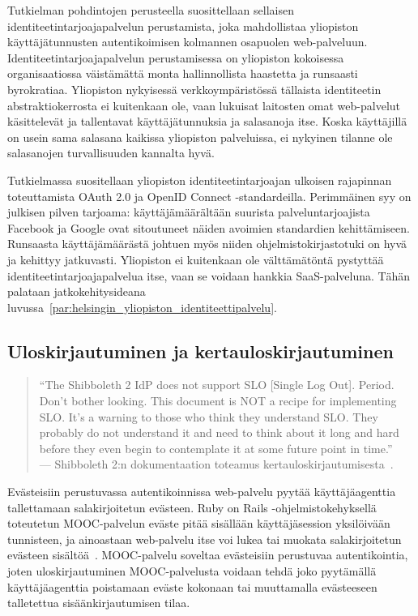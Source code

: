 \documentclass[finnish,gradu]{tktltiki}
\begin{document}
  Tutkielman pohdintojen perusteella suosittellaan sellaisen identiteetintarjoajapalvelun perustamista, joka mahdollistaa yliopiston käyttäjätunnusten autentikoimisen kolmannen osapuolen web-palveluun. Identiteetintarjoajapalvelun perustamisessa on yliopiston kokoisessa organisaatiossa väistämättä monta hallinnollista haastetta ja runsaasti byrokratiaa. Yliopiston nykyisessä verkkoympäristössä tällaista identiteetin abstraktiokerrosta ei kuitenkaan ole, vaan lukuisat laitosten omat web-palvelut käsittelevät ja tallentavat käyttäjätunnuksia ja salasanoja itse. Koska käyttäjillä on usein sama salasana kaikissa yliopiston palveluissa, ei nykyinen tilanne ole salasanojen turvallisuuden kannalta hyvä.

  Tutkielmassa suositellaan yliopiston identiteetintarjoajan ulkoisen rajapinnan toteuttamista OAuth 2.0 ja OpenID Connect -standardeilla. Perimmäinen syy on julkisen pilven tarjoama: käyttäjämäärältään suurista palveluntarjoajista Facebook ja Google ovat sitoutuneet näiden avoimien standardien kehittämiseen. Runsaasta käyttäjämäärästä johtuen myös niiden ohjelmistokirjastotuki on hyvä ja kehittyy jatkuvasti. Yliopiston ei kuitenkaan ole välttämätöntä pystyttää identiteetintarjoajapalvelua itse, vaan se voidaan hankkia SaaS-palveluna. Tähän palataan jatkokehitysideana luvussa~\ref{par:helsingin_yliopiston_identiteettipalvelu}.





  \subsection{Uloskirjautuminen ja kertauloskirjautuminen} %
  \label{sub:kertauloskirjautuminen}
    \begin{quote}
      ``The Shibboleth 2 IdP does not support SLO [Single Log Out]. Period. Don't bother looking. This document is NOT a recipe for implementing SLO. It's a warning to those who think they understand SLO. They probably do not understand it and need to think about it long and hard before they even begin to contemplate it at some future point in time.''
    \\--- Shibboleth 2:n dokumentaation toteamus kertauloskirjautumisesta~\cite{shibboleth_wiki_slo}.
    \end{quote}

  Evästeisiin perustuvassa autentikoinnissa web-palvelu pyytää käyttäjäagenttia tallettamaan salakirjoitetun evästeen. Ruby on Rails -ohjelmisto\-kehyksellä toteutetun MOOC-palvelun eväste pitää sisällään käyttäjäsession yksilöivään tunnisteen, ja ainoastaan web-palvelu itse voi lukea tai muokata salakirjoitetun evästeen sisältöä~\cite{awdr_2011}. MOOC-palvelu soveltaa evästeisiin perustuvaa autentikointia, joten uloskirjautuminen MOOC-palvelusta voidaan tehdä joko pyytämällä käyttäjäagenttia poistamaan eväste kokonaan tai muuttamalla evästeeseen talletettua sisäänkirjautumisen tilaa.
\end{document}
